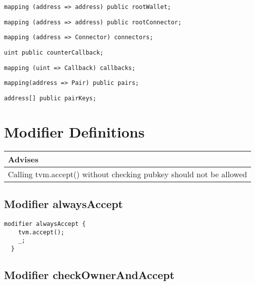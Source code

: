 \begin{lstlisting}[firstnumber=36]
  mapping (address => address) public rootWallet;
\end{lstlisting}

\begin{lstlisting}[firstnumber=37]
  mapping (address => address) public rootConnector;
\end{lstlisting}

\begin{lstlisting}[firstnumber=38]
  mapping (address => Connector) connectors;
\end{lstlisting}

\begin{lstlisting}[firstnumber=40]
  uint public counterCallback;
\end{lstlisting}

\begin{lstlisting}[firstnumber=57]
  mapping (uint => Callback) callbacks;
\end{lstlisting}

\begin{lstlisting}[firstnumber=69]
  mapping(address => Pair) public pairs;
\end{lstlisting}

\begin{lstlisting}[firstnumber=70]
  address[] public pairKeys;
\end{lstlisting}

\section{Modifier Definitions}


\ifsoldraft
\noindent\begin{tabular}{|p{12cm}|}\hline
\rowcolor{green}Advises
\\\hline
Calling tvm.accept() without checking pubkey should not be allowed
\\\hline\end{tabular}
\fi

\subsection{Modifier alwaysAccept}


\begin{lstlisting}[firstnumber=73]
  modifier alwaysAccept {
    tvm.accept();
    _;
  }
\end{lstlisting}

\subsection{Modifier checkOwnerAndAccept}


